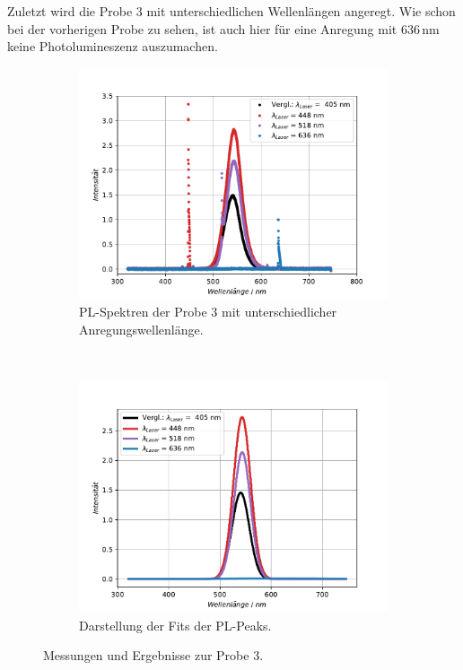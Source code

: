 Zuletzt wird die Probe 3 mit unterschiedlichen Wellenl\"{a}ngen angeregt.
Wie schon bei der vorherigen Probe zu sehen, ist auch hier f\"{u}r eine Anregung mit $636 \, \text{nm}$ keine Photolumineszenz auszumachen.
\begin{figure}[hbtp]
\centering
	\begin{subfigure}[t]{0.45\textwidth}
	\includegraphics[width=\textwidth]{Plots/aufgabe2P3.pdf}
	\caption{PL-Spektren der Probe 3 mit unterschiedlicher Anregungswellenl\"{a}nge.}
	\label{abb:auf2p3a}
	\end{subfigure}
	~
	\begin{subfigure}[t]{0.45\textwidth}
	\includegraphics[width=\textwidth]{Plots/aufgabe2P3_fit_1s.pdf}
	\caption{Darstellung der Fits der PL-Peaks.}
	\label{abb:auf2p3b}
	\end{subfigure}
\caption{Messungen und Ergebnisse zur Probe 3.}
\label{abb:auf2P3}
\end{figure}
